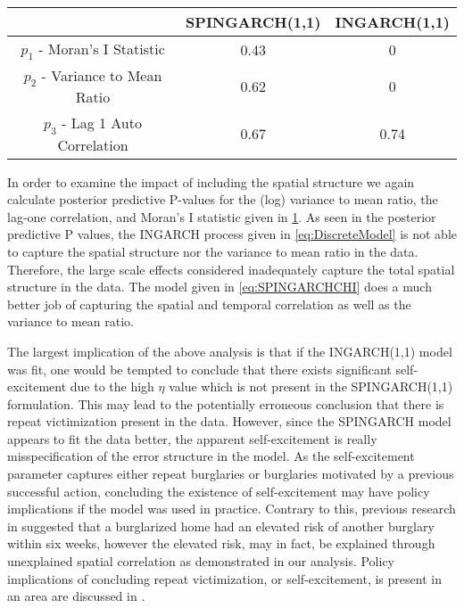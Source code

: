 \documentclass[11pt]{isuthesis}
\begin{document}
\begin{table}[!htp]
	 \label{Table:Pvals} 
	\begin{center}
		\begin{tabular}{ |c|c|c| } 
			\hline
			& SPINGARCH(1,1) & INGARCH(1,1)\\
			\hline 
			$p_1$ - Moran's I Statistic& 0.43 & 0 \\
			$p_2$ - Variance to Mean Ratio & 0.62 & 0\\
			$p_3$ - Lag 1 Auto Correlation & 0.67 & 0.74 \\ 
			\hline
		\end{tabular}
	\end{center}
\end{table}
In order to examine the impact of including the spatial structure we again calculate posterior predictive P-values for the (log) variance to mean ratio, the lag-one correlation, and Moran's I statistic given in \ref{Table:Pvals}.  As seen in the posterior predictive P values, the INGARCH process given in \eqref{eq:DiscreteModel} is not able to capture the spatial structure nor the variance to mean ratio in the data.  Therefore, the large scale effects considered inadequately capture the total spatial structure in the data. The model given in \eqref{eq:SPINGARCHCHI} does a much better job of capturing the spatial and temporal correlation as well as the variance to mean ratio. 

The largest implication of the above analysis is that if the INGARCH(1,1) model was fit, one would be tempted to conclude that there exists significant self-excitement due to the high $\eta$ value which is not present in the SPINGARCH(1,1) formulation.  This may lead to the potentially erroneous conclusion that there is repeat victimization present in the data.   However, since the SPINGARCH model appears to fit the data better, the apparent self-excitement is really misspecification of the error structure in the model.  As the self-excitement parameter captures either repeat burglaries or burglaries motivated by a previous successful action, concluding the existence of self-excitement may have policy implications if the model was used in practice.  Contrary to this, previous research in \cite{polvi1991time} suggested that a burglarized home had an elevated risk of another burglary within six weeks, however the elevated risk, may in fact, be explained through unexplained spatial correlation as demonstrated in our analysis.  Policy implications of concluding repeat victimization, or self-excitement, is present in an area are discussed in \cite{pease1998repeat}.  
\end{document}
